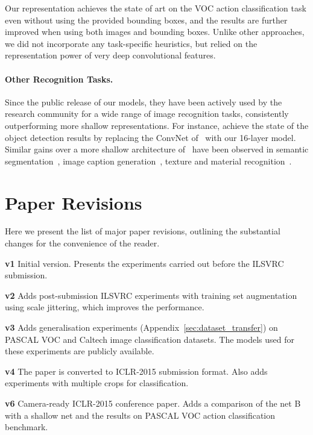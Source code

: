 \documentclass{article} \usepackage{iclr2015,times}
\newcommand{\apref}[1]{Appendix~\ref{#1}}
\begin{document}
Our representation achieves the state of art on the VOC action classification task even without using the provided bounding boxes, and the results are further improved when using both images and bounding boxes.
Unlike other approaches, we did not incorporate any task-specific heuristics, but relied on the representation power of very deep convolutional features.

\paragraph{Other Recognition Tasks.}
Since the public release of our models, they have been actively used by the research community for a wide range of image recognition tasks, consistently outperforming more shallow representations. For instance, \citet{Girshick14a} achieve the state of the object detection results by replacing the ConvNet of~\citet{Krizhevsky12} with our 16-layer model. Similar gains over a more shallow architecture of~\citet{Krizhevsky12} have been observed in semantic segmentation~\citep{Long14}, image caption generation~\citep{Kiros14,Karpathy14a}, texture and material recognition~\citep{Cimpoi14a,Bell14}.




\section{Paper Revisions}
\label{sec:revisions}
Here we present the list of major paper revisions, outlining the substantial changes for the convenience of the reader.

\textbf{v1} Initial version. Presents the experiments carried out before the ILSVRC submission.

\textbf{v2} Adds post-submission ILSVRC experiments with training set augmentation using scale jittering, which improves the performance.

\textbf{v3} Adds generalisation experiments (\apref{sec:dataset_transfer}) on PASCAL VOC and Caltech image classification datasets. The models used for these experiments are publicly available.

\textbf{v4} The paper is converted to ICLR-2015 submission format. Also adds experiments with multiple crops for classification.

\textbf{v6} Camera-ready ICLR-2015 conference paper. Adds a comparison of the net B with a shallow net and the results on PASCAL VOC action classification benchmark.
\end{document}
